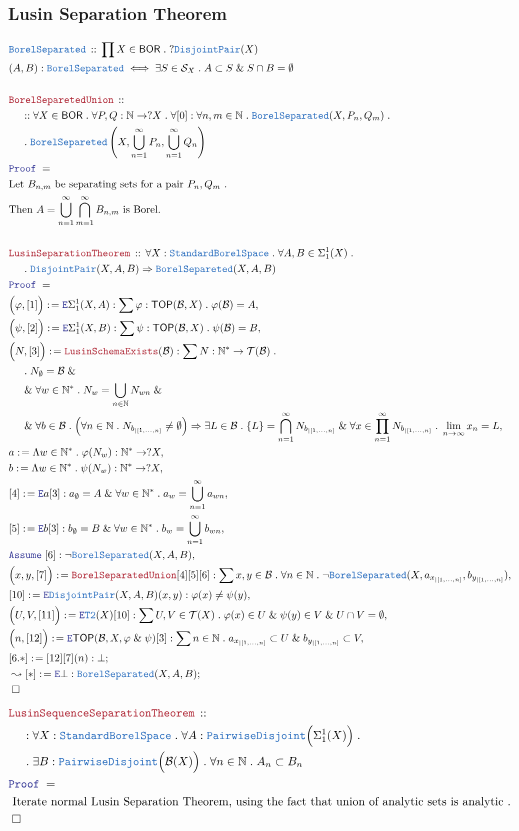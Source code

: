 \documentclass[12pt]{scrartcl}
\newcommand{\TYPE}[1]{\textcolor{NavyBlue}{\mathtt{#1}}}
\newcommand{\LOGIC}[1]{\textcolor{Blue}{\mathtt{#1}}}
\newcommand{\THM}[1]{\textcolor{Maroon}{\mathtt{#1}}}
\renewcommand{\.}{\; . \;}
\newcommand{\de}{: \kern 0.1pc =}
\newcommand{\Theorem}[2]{& \THM{#1} \, :: \, #2 \\ & \Proof = \\ }
\newcommand{\DeclareType}[2]{& \TYPE{#1} \, :: \, #2 \\}
\newcommand{\DefineType}[3]{& #1 : \TYPE{#2} \iff #3 \\}
\newcommand{\NewLine}{\\ & \kern 1pc}
\newcommand{\Page}[1]{ \begin{align*} #1 \end{align*}   }
\renewcommand{\And}{\; \& \;}
\newcommand{\Imply}{\Rightarrow}
\newcommand{\Elim}{\LOGIC{E}}
\newcommand{\Nat}{\mathbb{N} }
\newcommand{\Say}[3]{& #1 \de #2 : #3, \\}
\newcommand{\Conclude}[3]{& #1 \de #2 : #3; \\}
\newcommand{\DeriveConclude}[3]{& \leadsto #1 \de #2 : #3 ; \\}
\newcommand{\Assume}[2]{& \LOGIC{Assume} \; #1 : #2, \\}
\newcommand{\QED}{\; \square}
\newcommand{\EndProof}{& \QED \\}
\newcommand{\Proof}{\LOGIC{Proof} \; }
\newcommand{\Explain}[1]{& \text{#1.} \\}
\newcommand{\B}{\mathcal{B}}
\newcommand{\TOP}{\mathsf{TOP}}
\newcommand{\T}{\mathcal{T}}
\newcommand{\FS}[1]{{#1}{}^*}
\newcommand{\SBS}{\TYPE{StandardBorelSpace}}
\newcommand{\inits}[2]{{#1}_{|\left[1,\ldots,#2\right]}}
\newcommand{\BOR}{\mathsf{BOR}}
\renewcommand{\S}{\mathcal{S}}
\begin{document}
\subsubsection{Lusin Separation Theorem}
\Page{
	\DeclareType{BorelSeparated}
	{
		\prod X \in \BOR \.  ?\TYPE{DisjointPair}(X)
	}
	\DefineType{(A,B)}{BorelSeparated}
	{
		\exists S \in \S_X \.   A \subset S \And S \cap B = \emptyset
	}
	\\
	\Theorem{BorelSeparetedUnion}
	{
		\NewLine ::		
		\forall X \in \BOR \.
		\forall P,Q : \Nat \to ?X \.
		\forall [0] : \forall n,m \in \Nat \. \TYPE{BorelSeparated}(X,P_n,Q_m) 
		\. \NewLine \.
		\TYPE{BorelSepareted}\left( X, \bigcup_{n=1}^\infty P_n, \bigcup_{n=1}^\infty Q_n  \right) 	
	}
	\Explain{Let $B_{n,m}$ be separating sets for a pair $P_n,Q_m$ }
	\Explain{Then $A = \bigcup_{n=1}^\infty \bigcap_{m=1}^\infty B_{n,m}$ is Borel}
	\\
	\Theorem{LusinSeparationTheorem}
	{
		\forall X : \SBS \.
		\forall  A,B \in \Sigma^1_1(X) \. \NewLine \.
		\TYPE{DisjointPair}(X,A,B)
		\Imply
		\TYPE{BorelSepareted}(X,A,B)
	}
	\Say{\Big(\varphi,[1]\Big)}{\Elim \Sigma^1_1(X,A)}
	{
		\sum \varphi : \TOP(\B,X) \. \varphi(\B) = A
	}
	\Say{\Big(\psi,[2]\Big)}{\Elim \Sigma^1_1(X,B)}
	{
		\sum \psi : \TOP(\B,X) \. \psi(\B) = B
	}
	\Say{\Big(N,[3]\Big)}{\THM{LusinSchemaExists}(\B)}{
		\sum N : \FS{\Nat}  \to \T(\B) \. \NewLine \.
		N_\emptyset = \B \And \NewLine \And 
		\forall w \in \FS{\Nat} \.
		N_w = \bigcup_{n \in \Nat} N_{w n}  \And \NewLine \And
		\forall b \in \B \.   
		\Big(\forall n \in \Nat \. N_{\inits{b}{n}} \neq \emptyset \Big)
		\Imply
		\exists L \in \B \.
		\{ L \} = \bigcap^\infty_{n=1} N_{\inits{b}{n}} 
		\And
		\forall   x \in  \prod^\infty_{n=1} N_{\inits{b}{n}} \.
		\lim_{n \to \infty} x_n = L
	}
	\Say{a}{\Lambda w \in \FS{\Nat} \. \varphi(N_w)}{\FS{\Nat} \to ?X}
	\Say{b}{\Lambda w \in \FS{\Nat} \. \psi(N_w)}{\FS{\Nat} \to ?X}
	\Say{[4]}{\Elim a [3]}
	{
		a_\emptyset = A 
		\And
		\forall w \in \FS{\Nat} \.
		a_w = \bigcup^\infty_{n=1} a_{wn}	
	}
	\Say{[5]}{\Elim b [3]}
	{
		b_\emptyset = B 
		\And
		\forall w \in \FS{\Nat} \.
		b_w = \bigcup^\infty_{n=1} b_{wn}	
	}
	\Assume{[6]}{\neg \TYPE{BorelSeparated}(X,A,B)}
	\Say{\Big(x,y,[7]\Big)}{
		\THM{BorelSeparatedUnion}[4][5][6]
	}
	{
		\sum x,y \in \B \. 
		\forall n \in \Nat \.
		\neg \TYPE{BorelSeparated}(X,a_{\inits{x}{n}},b_{\inits{y}{n}})
	}
	\Say{[10]}{\Elim \TYPE{DisjointPair}(X,A,B)(x,y)}
	{
		\varphi(x) \neq \psi(y)
	}
	\Say{\Big(U,V,[11]\Big)}
	{
		\Elim \TYPE{T2}(X)[10]
	}
	{
		\sum U,V \in \T(X) \.
		\varphi(x) \in U \And \psi(y) \in V \And
		U \cap V = \emptyset
	}
	\Say{\Big(n,[12]\Big)}{\Elim \TOP(\B,X,\varphi \And \psi) [3]}
	{
		\sum n \in \Nat \.  a_{\inits{x}{n}} \subset U \And b_{\inits{y}{n}} \subset V
	}
	\Conclude{[6.*]}{[12][7](n)}{\bot}
	\DeriveConclude{[*]}{\Elim \bot}{\TYPE{BorelSeparated}(X,A,B)}
	\EndProof
}
\Page{
	\Theorem{LusinSequenceSeparationTheorem}
	{
		\NewLine :		
		\forall X : \SBS \.
		\forall  A : \TYPE{PairwiseDisjoint}\Big(\Sigma^1_1(X)\Big) \.
		\NewLine \. 
		\exists	B : \TYPE{PairwiseDisjoint}\Big(\B(X)\Big) \.
		\forall n \in \Nat \. A_n \subset B_n
	}
	\Explain{ 
		Iterate normal Lusin Separation Theorem, 
		using the fact that union of analytic sets is analytic
		}
	\EndProof
}
\newpage
\end{document}
